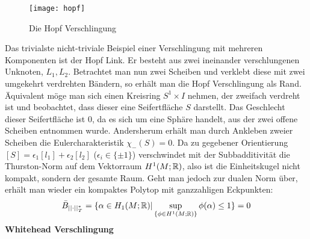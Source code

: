         \begin{wrapfigure}{r}{0.4\textwidth}
            \centering
            \texttt{[image: hopf]}
            \caption{Die Hopf Verschlingung}
            \label{fig:hopf}
        \end{wrapfigure}
        Das trivialste nicht-triviale Beispiel einer Verschlingung mit mehreren Komponenten ist der Hopf Link. Er besteht aus zwei ineinander verschlungenen Unknoten, $L_1, L_2$. Betrachtet man nun zwei Scheiben und verklebt diese mit zwei umgekehrt verdrehten Bändern, so erhält man die Hopf Verschlingung als Rand. Äquivalent möge man sich einen Kreisring $S^1 \times I$ nehmen, der zweifach verdreht ist und beobachtet, dass dieser eine Seifertfläche $S$ darstellt. Das Geschlecht dieser Seifertfläche ist $0$, da es sich um eine Sphäre handelt, aus der zwei offene Scheiben entnommen wurde. Andersherum erhält man durch Ankleben zweier Scheiben die Eulercharakteristik $\chi_-(S)=0$. Da zu gegebener Orientierung $[S] = \epsilon_1 [l_1]+ \epsilon_2 [l_2]$ ($\epsilon_i \in \{\pm 1\}$) verschwindet mit der Subbadditivität die Thurston-Norm auf dem Vektorraum $H^1(M;\mathbb{R})$, also ist die Einheitskugel nicht kompakt, sondern der gesamte Raum. Geht man jedoch zur dualen Norm über, erhält man wieder ein kompaktes Polytop mit ganzzahligen Eckpunkten: 
        \[
              \bar B_{||\cdot||_T^*}= \{\alpha \in H_1(M;\mathbb{R})| \sup_{\{\phi \in H^1(M;\mathbb{R})\}} \phi(\alpha)\leq 1\}=0
        \] 
        \textbf{Whitehead Verschlingung}

